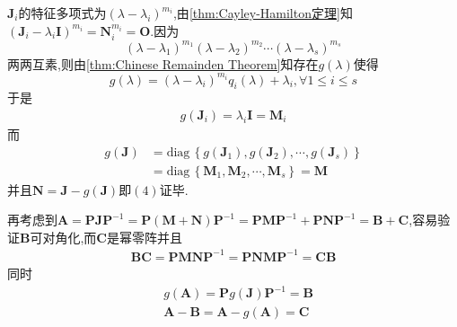 \begin{formal}
\begin{Proof}
    $\bm{J}_i$的特征多项式为$\left(\lambda-\lambda_i\right)^{m_i}$,由\cref{thm:Cayley-Hamilton定理}知$
    \left(
        \bm{J}_i-\lambda_i\bm{I}
    \right)^{m_i}=
        \bm{N}_i^{m_i}=\bm{O}
    $.因为\[
    \left(\lambda-\lambda_1\right)^{m_1}\left(\lambda-\lambda_2\right)^{m_2}\cdots\left(\lambda-\lambda_s\right)^{m_s}
    \]两两互素,则由\cref{thm:Chinese Remainden Theorem}知存在$g\left(\lambda\right)$使得\[
    g\left(\lambda\right)=\left(\lambda-\lambda_i\right)^{m_i}q_i\left(\lambda\right)+\lambda_i,\forall 1\leqslant i\leqslant s
    \]于是\begin{align*}
        g\left(\bm{J}_i\right)=\lambda_i\bm{I}=\bm{M}_i
    \end{align*}而\begin{align*}
        g\left(\bm{J}\right)&=\mathrm{diag}\,\left\{
            g\left(\bm{J}_1\right),g\left(\bm{J}_2\right),\cdots,g\left(\bm{J}_s\right)
        \right\}\\
        &=\mathrm{diag}\,\left\{
            \bm{M}_1,\bm{M}_2,\cdots,\bm{M}_s
        \right\}=\bm{M}
    \end{align*}并且$\bm{N}=\bm{J}-g\left(\bm{J}\right)$即$(4)$证毕.

    再考虑到$\bm{A}=\bm{P}\bm{JP}^{-1}=\bm{P}\left(\bm{M}+\bm{N}\right)\bm{P}^{-1}=\bm{P}\bm{MP}^{-1}+\bm{P}\bm{NP}^{-1}=\bm{B}+\bm{C}$,容易验证$\bm{B}$可对角化,而$\bm{C}$是幂零阵并且\begin{align*}
        \bm{BC}=\bm{PMNP}^{-1}=\bm{PNMP}^{-1}=\bm{CB}
    \end{align*}同时\begin{align*}
        &g\left(\bm{A}\right)=\bm{P}g\left(\bm{J}\right)\bm{P}^{-1}=\bm{B}\\
        &\bm{A}-\bm{B}=\bm{A}-g\left(\bm{A}\right)=\bm{C}
    \end{align*}


\end{Proof}
\end{formal}
